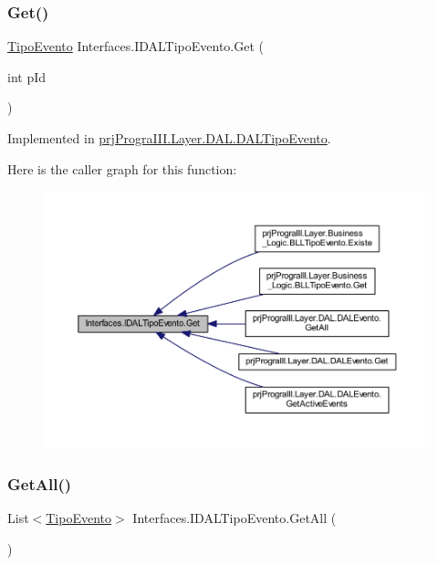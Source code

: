 \subsubsection{\texorpdfstring{Get()}{Get()}}
{\footnotesize\ttfamily \hyperlink{classprj_progra_i_i_i_1_1_layer_1_1_entities_1_1_tipo_evento}{Tipo\+Evento} Interfaces.\+I\+D\+A\+L\+Tipo\+Evento.\+Get (\begin{DoxyParamCaption}\item[{int}]{p\+Id }\end{DoxyParamCaption})}



Implemented in \hyperlink{classprj_progra_i_i_i_1_1_layer_1_1_d_a_l_1_1_d_a_l_tipo_evento_a43ec574ca3071e7b497613178a67a0fe}{prj\+Progra\+I\+I\+I.\+Layer.\+D\+A\+L.\+D\+A\+L\+Tipo\+Evento}.

Here is the caller graph for this function\+:
\nopagebreak
\begin{figure}[H]
\begin{center}
\leavevmode
\includegraphics[width=350pt]{interface_interfaces_1_1_i_d_a_l_tipo_evento_a28e0e3a7b6e9c4f4a04b787905d7270e_icgraph}
\end{center}
\end{figure}
\hypertarget{interface_interfaces_1_1_i_d_a_l_tipo_evento_a8e2c880d0b06a4ed517fddda2fba826b}{}\label{interface_interfaces_1_1_i_d_a_l_tipo_evento_a8e2c880d0b06a4ed517fddda2fba826b} 
\subsubsection{\texorpdfstring{Get\+All()}{GetAll()}}
{\footnotesize\ttfamily List$<$\hyperlink{classprj_progra_i_i_i_1_1_layer_1_1_entities_1_1_tipo_evento}{Tipo\+Evento}$>$ Interfaces.\+I\+D\+A\+L\+Tipo\+Evento.\+Get\+All (\begin{DoxyParamCaption}{ }\end{DoxyParamCaption})}



